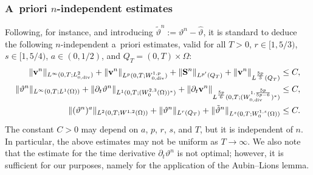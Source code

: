 \documentclass[11pt, a4paper, reqno]{amsart}
\numberwithin{equation}{section}
\newcommand{\diver}{\operatorname{div}}
\newcommand{\thetah}{\hat\thet}
\newcommand{\thetat}{\tilde\thet}
\newcommand{\vc}[1]{{\bf #1}}
\newcommand{\vv}{\vc{v}}
\newcommand{\thet}{\vartheta}
\renewcommand{\S}{\mathbf{S}}
\newcommand{\nm}[1]{\|#1\|}
\begin{document}
\subsubsection{A~priori $n$-independent estimates}
Following, for instance, \cite{BuFeMa2009, BuMaRa09} and introducing $\thetat^n := \thet^n - \thetah$, it is standard to deduce the following $n$-independent a~priori estimates, valid for all $T>0$, $r \in [1,5/3)$, $s \in [1,5/4)$, $a\in (0,1/2)$, and $Q_T = (0,T)\times\Omega$:
\begin{align}
    \label{apr:vn}
      \nm{\vv^{n}}_{L^\infty(0,T; L^2_{0,\diver})}+\nm{\vv^{n}}_{L^p(0,T; W^{1,p}_{0,\diver})}+\nm{\S^n}_{L^{p'}(Q_T)}+\nm{\vv^{n}}_{L^{\frac{5p}3}(Q_T)}&\leq C,
    \\
   \label{timen}
 \nm{\thet^n}_{L^\infty(0,T;L^1(\Omega))}+\nm{\partial_t \thet^n}_{L^1(0, T; (W^{2, 3}_0(\Omega))^*)}+\nm{\partial_t\vv^n}_{L^{\frac{5p}6}(0, T; (W^{1,\frac{5p}{5p-6}}_{0,\diver})^*)} &\leq C,\\
\label{eq:re3}
   \nm{(\thet^n)^a}_{L^2(0,T;W^{1,2}(\Omega))}+\nm{\thet^n}_{L^r(Q_T)}+\nm{\thetat^n}_{L^s(0, T; W_0^{1,s}(\Omega))}&\leq C.
\end{align}
The constant $C>0$ may depend on $a$, $p$, $r$, $s$, and $T$, but it is independent of $n$. In particular, the above estimates may not be uniform as $T \to \infty$. 
We also note that the estimate for the time derivative $\partial_t \thet^{n}$ is not optimal; however, it is sufficient for our purposes, namely for the application of the Aubin--Lions lemma.
\end{document}
